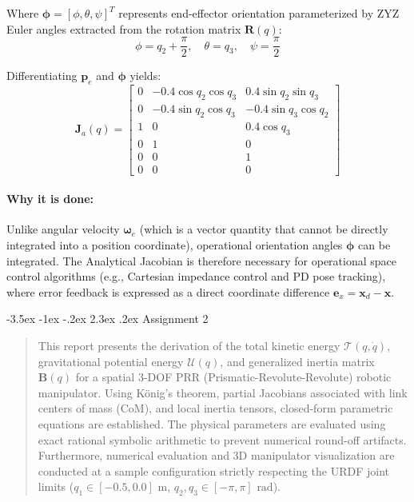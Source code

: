 \documentclass[11pt, a4paper]{article}
\makeatletter
\renewcommand{\section}{\@startsection{section}{1}{\z@}%
    {-3.5ex \@plus -1ex \@minus -.2ex}%
    {2.3ex \@plus .2ex}%
    {\normalfont\Large\bfseries\color{brandblue}}}
\makeatother
\begin{document}
Where $\boldsymbol{\phi} = [\phi, \theta, \psi]^T$ represents end-effector orientation parameterized by ZYZ Euler angles extracted from the rotation matrix $\mathbf{R}(q)$:
\begin{equation}
    \phi = q_2 + \frac{\pi}{2}, \quad \theta = q_3, \quad \psi = \frac{\pi}{2}
\end{equation}

Differentiating $\mathbf{p}_e$ and $\boldsymbol{\phi}$ yields:
\begin{equation}
\mathbf{J}_a(q) = \begin{bmatrix}
0 & -0.4 \cos q_2 \cos q_3 & 0.4 \sin q_2 \sin q_3 \\
0 & -0.4 \sin q_2 \cos q_3 & -0.4 \sin q_3 \cos q_2 \\
1 & 0 & 0.4 \cos q_3 \\
0 & 1 & 0 \\
0 & 0 & 1 \\
0 & 0 & 0
\end{bmatrix}
\end{equation}

\paragraph{Why it is done:}
Unlike angular velocity $\boldsymbol{\omega}_e$ (which is a vector quantity that cannot be directly integrated into a position coordinate), operational orientation angles $\boldsymbol{\phi}$ can be integrated. The Analytical Jacobian is therefore necessary for operational space control algorithms (e.g., Cartesian impedance control and PD pose tracking), where error feedback is expressed as a direct coordinate difference $\mathbf{e}_x = \mathbf{x}_d - \mathbf{x}$.

\newpage

\section{Assignment 2}
\label{sec:assignment2}

\begin{abstract}
\noindent
This report presents the derivation of the total kinetic energy $\mathcal{T}(q, \dot{q})$, gravitational potential energy $\mathcal{U}(q)$, and generalized inertia matrix $\mathbf{B}(q)$ for a spatial 3-DOF PRR (Prismatic-Revolute-Revolute) robotic manipulator. Using König's theorem, partial Jacobians associated with link centers of mass (CoM), and local inertia tensors, closed-form parametric equations are established. The physical parameters are evaluated using exact rational symbolic arithmetic to prevent numerical round-off artifacts. Furthermore, numerical evaluation and 3D manipulator visualization are conducted at a sample configuration strictly respecting the URDF joint limits ($q_1 \in [-0.5, 0.0]\text{ m}$, $q_2, q_3 \in [-\pi, \pi]\text{ rad}$).
\end{abstract}
\end{document}
